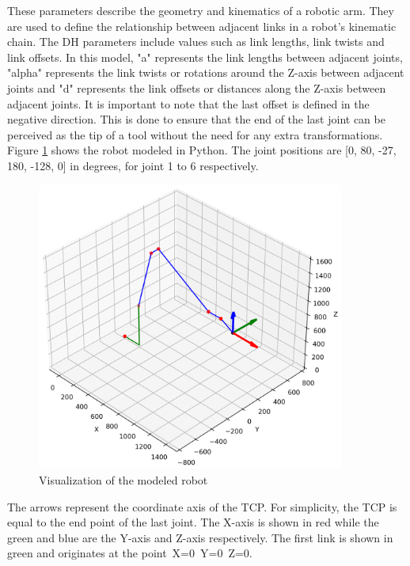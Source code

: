 These parameters describe the geometry and kinematics of a robotic arm. They are used to define the relationship between adjacent links in a robot's kinematic chain. The DH parameters include values such as link lengths, link twists and link offsets. In this model, "a" represents the link lengths between adjacent joints, "alpha" represents the link twists or rotations around the Z-axis between adjacent joints and "d" represents the link offsets or distances along the Z-axis between adjacent joints. 
It is important to note that the last offset is defined in the negative direction. This is done to ensure that the end of the last joint can be perceived as the tip of a tool without the need for any extra transformations.
Figure \ref{robotprog} shows the robot modeled in Python. The joint positions are [0, 80, -27, 180, -128, 0] in degrees, for joint 1 to 6 respectively.

 \begin{figure}[H]
	\centerline{\includegraphics[width=0.9\textwidth]{figures/robotprog.png}}
	\caption{Visualization of the modeled robot}
	\label{robotprog}
\end{figure}


The arrows represent the coordinate axis of the TCP. For simplicity, the TCP is equal to the end point of the last joint. The X-axis is shown in red while the green and blue are the Y-axis and Z-axis respectively. The first link is shown in green and originates at the point~X=0~Y=0~Z=0.


